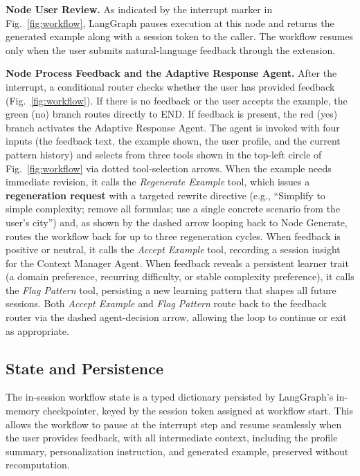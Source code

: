 \documentclass[conference]{IEEEtran}
\begin{document}
\textbf{Node User Review.} As indicated by the interrupt marker in Fig.~\ref{fig:workflow}, LangGraph pauses execution at this node and returns the generated example along with a session token to the caller. The workflow resumes only when the user submits natural-language feedback through the extension.

\textbf{Node Process Feedback and the Adaptive Response Agent.} After the interrupt, a conditional router checks whether the user has provided feedback (Fig.~\ref{fig:workflow}). If there is no feedback or the user accepts the example, the green (no) branch routes directly to END. If feedback is present, the red (yes) branch activates the Adaptive Response Agent. The agent is invoked with four inputs (the feedback text, the example shown, the user profile, and the current pattern history) and selects from three tools shown in the top-left circle of Fig.~\ref{fig:workflow} via dotted tool-selection arrows. When the example needs immediate revision, it calls the \textit{Regenerate Example} tool, which issues a \textbf{regeneration request} with a targeted rewrite directive (e.g., ``Simplify to simple complexity; remove all formulas; use a single concrete scenario from the user's city'') and, as shown by the dashed arrow looping back to Node Generate, routes the workflow back for up to three regeneration cycles. When feedback is positive or neutral, it calls the \textit{Accept Example} tool, recording a session insight for the Context Manager Agent. When feedback reveals a persistent learner trait (a domain preference, recurring difficulty, or stable complexity preference), it calls the \textit{Flag Pattern} tool, persisting a new learning pattern that shapes all future sessions. Both \textit{Accept Example} and \textit{Flag Pattern} route back to the feedback router via the dashed agent-decision arrow, allowing the loop to continue or exit as appropriate.

\subsection{State and Persistence}

The in-session workflow state is a typed dictionary persisted by LangGraph's in-memory checkpointer, keyed by the session token assigned at workflow start. This allows the workflow to pause at the interrupt step and resume seamlessly when the user provides feedback, with all intermediate context, including the profile summary, personalization instruction, and generated example, preserved without recomputation.
\end{document}
